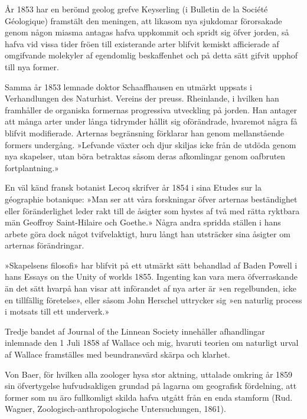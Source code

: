 År 1853 har en berömd geolog grefve Keyserling (i Bulletin de la Société Géologique) framstält den meningen, att likasom nya sjukdomar förorsakade genom någon miasma antagas hafva uppkommit och spridt sig öfver jorden, så hafva vid vissa tider fröen till existerande arter blifvit kemiskt afficierade af omgifvande molekyler af egendomlig beskaffenhet och på detta sätt gifvit upphof till nya former.

Samma år 1853 lemnade doktor Schaaffhausen en utmärkt uppsats i Verhandlungen des Naturhist. Vereins der preuss. Rheinlande, i hvilken han framhåller de organiska formernas progressiva utveckling på jorden. Han antager att många arter under långa tidrymder hållit sig oförändrade, hvaremot några få blifvit modifierade. Arternas begränsning förklarar han genom mellanstående formers undergång. »Lefvande växter och djur skiljas icke från de utdöda genom nya skapelser, utan böra betraktas såsom deras afkomlingar genom oafbruten fortplantning.»

En väl känd fransk botanist Lecoq skrifver år 1854 i sina Etudes sur la géographie botanique: »Man ser att våra forskningar öfver arternas beständighet eller föränderlighet leder rakt till de åsigter som hystes af två med rätta ryktbara män Geoffroy Saint-Hilaire och Goethe.» Några andra spridda ställen i hans arbete göra dock något tvifvelaktigt, huru långt han utsträcker sina åsigter om arternas förändringar.

»Skapelsens filosofi» har blifvit på ett utmärkt sätt behandlad af Baden Powell i hans Essays on the Unity of worlds 1855. Ingenting kan vara mera öfverraskande än det sätt hvarpå han visar att införandet af nya arter är »en regelbunden, icke en tillfällig företelse», eller såsom John Herschel uttrycker sig »en naturlig process i motsats till ett underverk.»

Tredje bandet af Journal of the Linnean Society innehåller afhandlingar inlemnade den 1 Juli 1858 af Wallace och mig, hvaruti teorien om naturligt urval af Wallace framställes med beundransvärd skärpa och klarhet.

Von Baer, för hvilken alla zoologer hysa stor aktning, uttalade omkring år 1859 sin öfvertygelse hufvudsakligen grundad på lagarna om geografisk fördelning, att former som nu äro fullkomligt skilda hafva utgått från en enda stamform (Rud. Wagner, Zoologisch-anthropologische Untersuchungen, 1861).


